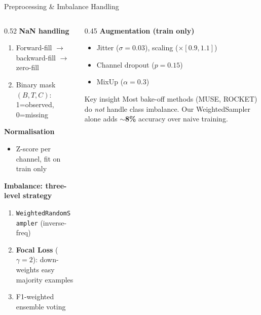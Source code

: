 \documentclass[aspectratio=169, 10pt]{beamer}
\begin{document}
\begin{frame}{Preprocessing \& Imbalance Handling}
  \begin{columns}
    \begin{column}{0.52\textwidth}
      \textbf{NaN handling}
      \begin{enumerate}
        \item Forward-fill $\to$ backward-fill $\to$ zero-fill
        \item Binary mask $(B, T, C)$: 1=observed, 0=missing
      \end{enumerate}
      \vspace{0.4em}
      \textbf{Normalisation}
      \begin{itemize}
        \item Z-score per channel, fit on train only
      \end{itemize}
      \vspace{0.4em}
      \textbf{Imbalance: three-level strategy}
      \begin{enumerate}
        \item \texttt{WeightedRandomSampler} (inverse-freq)
        \item \textbf{Focal Loss} ($\gamma=2$): down-weights easy majority examples
        \item F1-weighted ensemble voting
      \end{enumerate}
    \end{column}
    \begin{column}{0.45\textwidth}
      \textbf{Augmentation (train only)}
      \begin{itemize}
        \item Jitter ($\sigma=0.03$), scaling ($\times[0.9,1.1]$)
        \item Channel dropout ($p=0.15$)
        \item MixUp ($\alpha=0.3$)
      \end{itemize}
      \vspace{0.5em}
      \begin{block}{Key insight}
        \small Most bake-off methods (MUSE, ROCKET)
        do \emph{not} handle class imbalance.
        Our WeightedSampler alone adds
        \textbf{$\sim$8\%} accuracy over naive training.
      \end{block}
    \end{column}
  \end{columns}
\end{frame}
\end{document}
